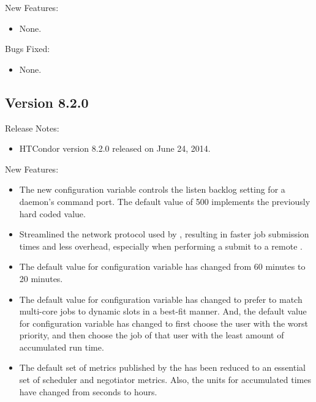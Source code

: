 \noindent New Features:

\begin{itemize}

\item None.

\end{itemize}

\noindent Bugs Fixed:

\begin{itemize}

\item None.

\end{itemize}

\subsection*{\label{sec:New-8-2-0}Version 8.2.0}

\noindent Release Notes:

\begin{itemize}

\item HTCondor version 8.2.0 released on June 24, 2014.

\end{itemize}


\noindent New Features:

\begin{itemize}

\item The new configuration variable 
controls the listen backlog setting for a daemon's command port.
The default value of 500 implements the previously hard coded value.

\item Streamlined the network protocol used by ,
resulting in faster job submission times and less  overhead, 
especially when performing a submit to a remote .

\item The default value for configuration variable  
has changed from 60 minutes to 20 minutes.

\item The default value for configuration variable 
 has changed to prefer to match
multi-core jobs to dynamic slots in a best-fit manner.
And, the default value for configuration variable
 has changed to first choose the user with the
worst priority, and then choose the job of that user with the least
amount of accumulated run time. 

\item The default set of metrics published by the  has been
reduced to an essential set of scheduler and negotiator metrics.
Also, the units for accumulated times have changed from seconds to hours.

\end{itemize}

